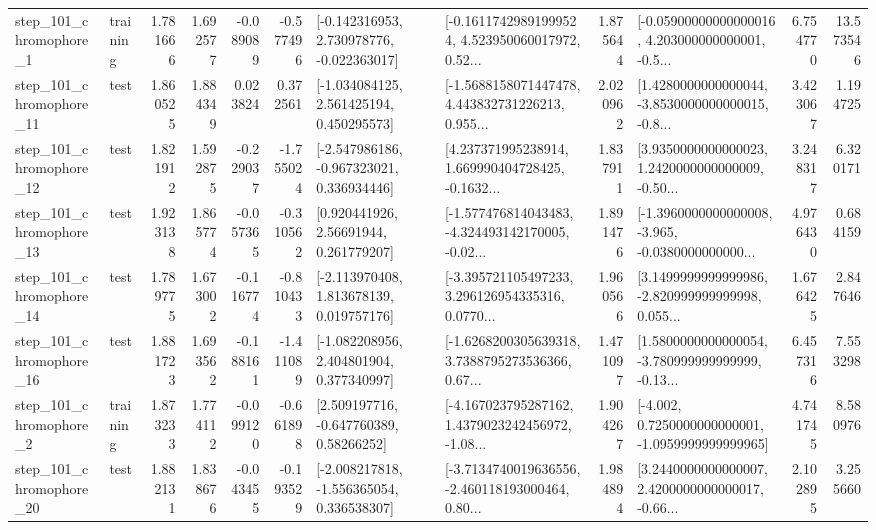 \begin{tabular}{llrrrrllrlrr}
   step\_101\_chromophore\_1 &  training &      1.781666 &    1.692577 &     -0.089089 & -0.577496 &   [-0.142316953, 2.730978776, -0.022363017] &  [-0.16117429891999524, 4.523950060017972, 0.52... &       1.875644 &  [-0.05900000000000016, 4.203000000000001, -0.5... &            6.754770 &         13.573546 \\
  step\_101\_chromophore\_11 &      test &      1.860525 &    1.884349 &      0.023824 &  0.372561 &    [-1.034084125, 2.561425194, 0.450295573] &  [-1.5688158071447478, 4.443832731226213, 0.955... &       2.020962 &  [1.4280000000000044, -3.8530000000000015, -0.8... &            3.423067 &          1.194725 \\
  step\_101\_chromophore\_12 &      test &      1.821912 &    1.592875 &     -0.229037 & -1.755024 &   [-2.547986186, -0.967323021, 0.336934446] &  [4.237371995238914, 1.669990404728425, -0.1632... &       1.837911 &  [3.9350000000000023, 1.2420000000000009, -0.50... &            3.248317 &          6.320171 \\
  step\_101\_chromophore\_13 &      test &      1.923138 &    1.865774 &     -0.057365 & -0.310562 &      [0.920441926, 2.56691944, 0.261779207] &  [-1.577476814043483, -4.324493142170005, -0.02... &       1.891476 &  [-1.3960000000000008, -3.965, -0.0380000000000... &            4.976430 &          0.684159 \\
  step\_101\_chromophore\_14 &      test &      1.789775 &    1.673002 &     -0.116774 & -0.810433 &    [-2.113970408, 1.813678139, 0.019757176] &  [-3.395721105497233, 3.296126954335316, 0.0770... &       1.960566 &  [3.1499999999999986, -2.820999999999998, 0.055... &            1.676425 &          2.847646 \\
  step\_101\_chromophore\_16 &      test &      1.881723 &    1.693562 &     -0.188161 & -1.411089 &    [-1.082208956, 2.404801904, 0.377340997] &  [-1.6268200305639318, 3.7388795273536366, 0.67... &       1.471097 &  [1.5800000000000054, -3.780999999999999, -0.13... &            6.457316 &          7.553298 \\
   step\_101\_chromophore\_2 &  training &      1.873233 &    1.774112 &     -0.099120 & -0.661898 &     [2.509197716, -0.647760389, 0.58266252] &  [-4.167023795287162, 1.4379023242456972, -1.08... &       1.904267 &  [-4.002, 0.7250000000000001, -1.0959999999999965] &            4.741745 &          8.580976 \\
  step\_101\_chromophore\_20 &      test &      1.882131 &    1.838676 &     -0.043455 & -0.193529 &   [-2.008217818, -1.556365054, 0.336538307] &  [-3.7134740019636556, -2.460118193000464, 0.80... &       1.984894 &  [3.2440000000000007, 2.4200000000000017, -0.66... &            2.102895 &          3.255660 \\

\end{tabular}
